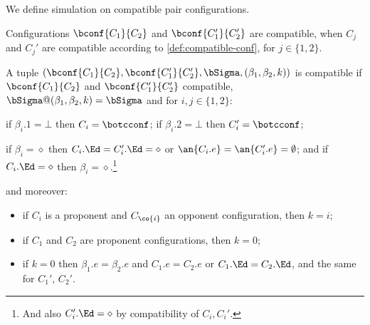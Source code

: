 We define simulation on compatible pair configurations.


\begin{definition}
  Configurations $\bconf{C_1}{C_2}$ and $\bconf{C_1'}{C_2'}$ are compatible, when $C_j$ and $C_j'$ are compatible according to \cref{def:compatible-conf}, for $j\in\{1,2\}$.

  A tuple $(\bconf{C_1}{C_2}, \bconf{C_1'}{C_2'}, \bSigma, (\beta_1,\beta_2,k))$ is compatible if 
  $\bconf{C_1}{C_2}$ and $\bconf{C_1'}{C_2'}$ compatible, $\bSigma@(\beta_1,\beta_2,k)=\bSigma$ and
  for $i,j\in\{1,2\}$:
  \begin{compactenum}
  \item[($\bot$)] if $\beta_i.1=\bot$ then $C_i=\botcconf$; if $\beta_i.2=\bot$ then $C_i'=\botcconf$;
  \item[($\diamond$)] if $\beta_i=\diamond$ then $C_i.\Ed=C_i'.\Ed=\diamond$ or $\an{C_i.e}=\an{C_i'.e}=\emptyset$; and if $C_i.\Ed=\diamond$ then $\beta_i=\diamond$.\footnote{And also $C_i'.\Ed=\diamond$ by compatibility of $C_i, C_i'$.}
    \end{compactenum}
    and moreover:
  \begin{itemize}
    \item if $C_i$ is a proponent and $C_{\co{i}}$ an opponent configuration, then $k=i$;
    \item if $C_1$ and $C_2$ are proponent configurations, then $k=0$;
    \item if $k=0$ then $\beta_1.e=\beta_2.e$ and $C_1.e = C_2.e$ or $C_1.\Ed = C_2.\Ed$, and the same for $C_1'$, $C_2'$.
  \end{itemize}
\end{definition}

